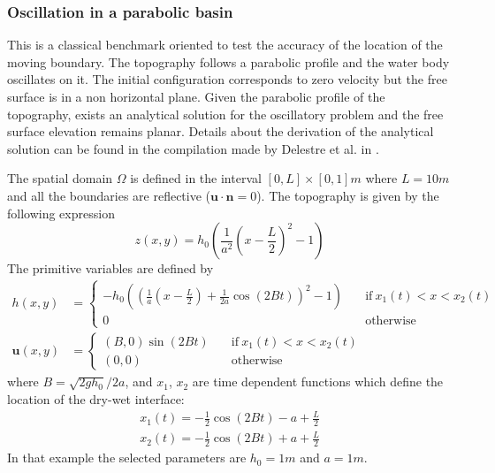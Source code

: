 \subsubsection{Oscillation in a parabolic basin}

This is a classical benchmark oriented to test the accuracy of the location of the moving boundary. The topography follows a parabolic profile and the water body oscillates on it. The initial configuration corresponds to zero velocity but the free surface is in a non horizontal plane. Given the parabolic profile of the topography, exists an analytical solution for the oscillatory problem and the free surface elevation remains planar. Details about the derivation of the analytical solution can be found in the compilation made by Delestre et al. in \cite{delestre2013}.

The spatial domain $\Omega$ is defined in the interval $[0,L]\times[0,1]m$ where $L=10m$ and all the boundaries are reflective ($\mathbf{u}\cdot\mathbf{n} = 0$). The topography is given by the following expression
\begin{equation}
z(x,y) = h_0 \left(\frac{1}{a^2}\left(x - \frac{L}{2}\right)^2 - 1\right)
\end{equation}
The primitive variables are defined by
\begin{subequations}
\begin{align}
h(x,y) &=
\begin{cases}
-h_0\left(\left(\frac{1}{a}\left(x - \frac{L}{2}\right) + \frac{1}{2a}\cos(2Bt)\right)^2 - 1\right)
\quad &\text{if} \ x_1(t) < x < x_2(t) \\
0 \quad &\text{otherwise}
\end{cases} \\
\mathbf{u}(x,y) &=
\begin{cases}
(B,0)\sin(2Bt) \quad &\text{if} \ x_1(t) < x < x_2(t) \\
(0,0) \quad &\text{otherwise}
\end{cases}
\end{align}
\end{subequations}
where $B=\sqrt{2gh_0}/2a$, and $x_1$, $x_2$ are time dependent functions which define the location of the dry-wet interface:
\begin{equation}
\begin{split}
x_1(t) = -\frac{1}{2}\cos(2Bt) - a + \frac{L}{2} \\
x_2(t) = -\frac{1}{2}\cos(2Bt) + a + \frac{L}{2}
\end{split}
\end{equation}
In that example the selected parameters are $h_0=1m$ and $a=1m$.


